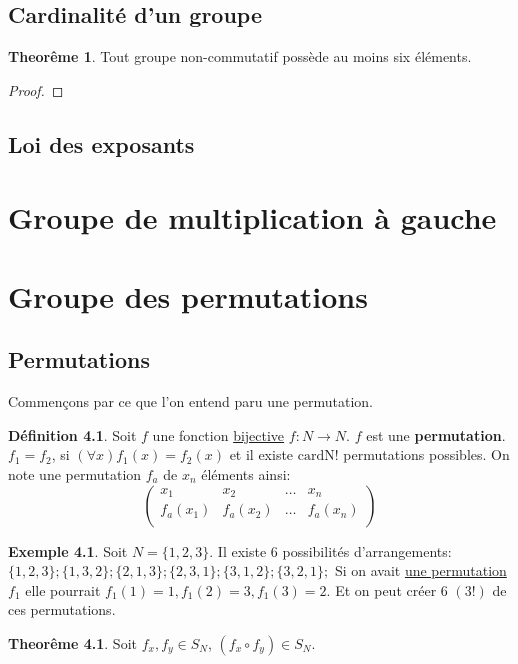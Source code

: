 \documentclass[12pt]{book}
\theoremstyle{definition}
\newtheorem{definition}{Définition}[section]
\newtheorem*{example}{Exemple}
\newtheorem{theorem}{Theorême}[section]
\begin{document}
\section{Cardinalité d'un groupe}
\begin{theorem}
    Tout groupe non-commutatif possède au moins six éléments.
\end{theorem}
\begin{proof}
\end{proof}
\section{Loi des exposants}
\chapter{Groupe de multiplication à gauche}
\chapter{Groupe des permutations}

\section{Permutations}
Commençons par ce que l'on entend paru une permutation.

\begin{definition}
    \label{def:permutation}
    Soit $f$ une fonction \hyperref[def:bijective]{bijective} $f: N \to N$. $f$ est une \textbf{permutation}.
    $f_1 = f_2$, si $(\forall x) f_1(x) = f_2(x)$ et il existe $\text{card{N}}!$ permutations possibles. 
    On note une permutation $f_a$ de $x_n$ éléments ainsi: $$\begin{pmatrix}
        x_1 & x_2 & \dots & x_n \\
        f_a(x_1) & f_a(x_2) & \dots & f_a(x_n) \\
    \end{pmatrix}$$
\end{definition}
\begin{example}
    Soit $N = \{1, 2, 3\}$. Il existe 6 possibilités d'arrangements:
    $\{1, 2, 3\};\{1, 3, 2\};\{2, 1, 3\};\{2, 3, 1\};\{3, 1, 2\};\{3, 2, 1\};$
    Si on avait \hyperref[def:permutation]{une permutation} $f_1$ elle pourrait $f_1(1) = 1, f_1(2) = 3, f_1(3) = 2$.
    Et on peut créer 6 $(3!)$ de ces permutations.
\end{example}

\begin{theorem}
    \label{thm:composition_permutation} 
    Soit $f_x, f_y \in S_N$, $(f_x \circ f_y) \in S_N$. 
\end{theorem}
\end{document}
